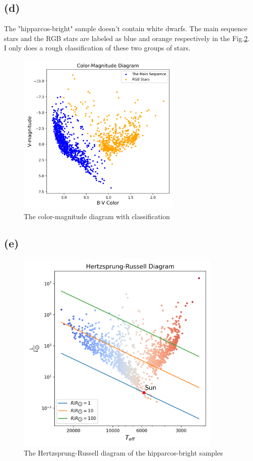 \documentclass[a4paper,12pt]{article}
\begin{document}
\subsection*{(d)}
The "hipparcos-bright" sample doesn't contain white dwarfs. The main sequence 
stars and the RGB stars are labeled as 
blue and orange respectively in the Fig.\ref{class}. 
I only does a rough classification of these two groups of stars.
\begin{figure}[htbp]
    \centering
    \includegraphics[width=8cm]{two_class.png}
    \caption{The color-magnitude diagram with classification}
    \label{class}
\end{figure}

\subsection*{(e)}
\begin{figure}[htbp]
    \centering
    \includegraphics[width=10cm]{HR_diag.png}
    \caption{The Hertzsprung-Russell diagram of the hipparcos-bright samples}
    \label{class}
\end{figure}
\end{document}
